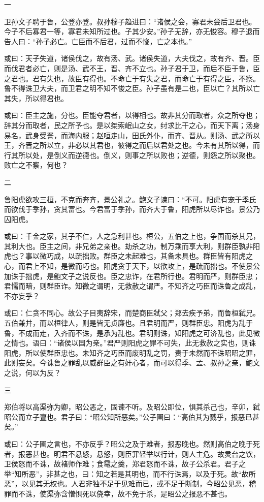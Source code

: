 \documentclass[]{article}
\begin{document}
一

卫孙文子聘于鲁，公登亦登。叔孙穆子趋进曰：``诸侯之会，寡君未尝后卫君也。今子不后寡君一等，寡君未知所过也。子其少安。''孙子无辞，亦无悛容。穆子退而告人曰：``孙子必亡。亡臣而不后君，过而不悛，亡之本也。''

或曰：天子失道，诸侯伐之，故有汤、武。诸侯失道，大夫伐之，故有齐、晋。臣而伐君者必亡，则是汤、武不王，晋、齐不立也。孙子君于卫，而后不臣于鲁，臣之君也。君有失也，故臣有得也。不命亡于有失之君，而命亡于有得之臣，不察。鲁不得诛卫大夫，而卫君之明不知不悛之臣。孙子虽有是二也，臣以亡？其所以亡其失，所以得君也。

或曰：臣主之施，分也。臣能夺君者，以得相也。故非其分而取者，众之所夺也；辞其分而取者，民之所予也。是以桀索岷山之女，纣求比干之心，而天下离；汤身易名，武身受詈，而海内服；赵咺走山，田氏外仆，而齐、晋从。则汤、武之所以王，齐晋之所以立，非必以其君也，彼得之而后以君处之也。今未有其所以得，而行其所以处，是倒义而逆德也。倒义，则事之所以败也；逆德，则怨之所以聚也。败亡之不察，何也？

二

鲁阳虎欲攻三桓，不克而奔齐，景公礼之。鲍文子谏曰：``不可。阳虎有宠于季氏而欲伐于季孙，贪其富也。今君富于季孙，而齐大于鲁，阳虎所以尽诈也。景公乃囚阳虎。

或曰：千金之家，其子不仁，人之急利甚也。桓公，五伯之上也，争国而杀其兄，其利大也。臣主之间，非兄弟之亲也。劫杀之功，制万乘而享大利，则群臣孰非阳虎也？事以微巧成，以疏拙败。群臣之未起难也，其备未具也。群臣皆有阳虎之心，而君上不知，是微而巧也。阳虎贪于天下，以欲攻上，是疏而拙也。不使景公加诛于拙虎，是鲍文子之说反也。臣之忠诈，在君所行也。君明而严，则群臣忠；君懦而暗，则群臣诈。知微之谓明，无救赦之谓严。不知齐之巧臣而诛鲁之成乱，不亦妄乎？

或曰：仁贪不同心。故公子目夷辞宋，而楚商臣弑父；郑去疾予弟，而鲁桓弑兄。五伯兼并，而以桓律人，则是皆无贞廉也。且君明而严，则群臣忠。阳虎为乱于鲁，不成而走，入齐而不诛，是承为乱也。君明则诛，知阳虎之可济乱也，此见微之情也。语曰：``诸侯以国为亲。''君严则阳虎之罪不可失，此无救赦之实也，则诛阳虎，所以使群臣忠也。未知齐之巧臣而废明乱之罚，责于未然而不诛昭昭之罪，此则妄矣。今诛鲁之罪乱以威群臣之有奸心者，而可以得季、孟、叔孙之亲，鲍文之说，何以为反？

三

郑伯将以高渠弥为卿，昭公恶之，固谏不听。及昭公即位，惧其杀己也，辛卯，弑昭公而立子亶也。君子曰：``昭公知所恶矣。''公子圉曰：``高伯其为戮乎，报恶已甚矣。''

或曰：公子圉之言也，不亦反乎？昭公之及于难者，报恶晚也。然则高伯之晚于死者，报恶甚也。明君不悬怒，悬怒，则臣罪轻举以行计，则人主危。故灵台之饮，卫侯怒而不诛，故褚师作难；食鼋之羹，郑君怒而不诛，故子公杀君。君子之举``知所恶''，非甚之也，曰：知之若是其明也，而不行诛焉，以及于死。故``故所恶''，以见其无权也。人君非独不足于见难而已，或不足于断制，今昭公见恶，稽罪而不诛，使渠弥含憎惧死以侥幸，故不免于杀，是昭公之报恶不甚也。
\end{document}

